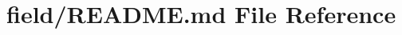 \hypertarget{field_2README_8md}{}\section{field/\+R\+E\+A\+D\+M\+E.md File Reference}
\label{field_2README_8md}
